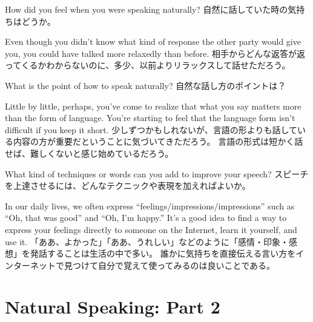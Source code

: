 \documentclass[uplatex,dvipdfmx,b5paper,english,10pt]{jsbook}
\newif\ifNATURALSPEAKINGPARTTWO
\begin{document}
\begin{toiquestion}
\ifEnglish
How did you feel when you were speaking naturally?
\else
自然に話していた時の気持ちはどうか。
\fi
\end{toiquestion}
\begin{toianswer}
\ifEnglish
Even though you didn't know what kind of response the other party would give you, you could have talked more relaxedly than before.
\else
相手からどんな返答が返ってくるかわからないのに、多少、以前よりリラックスして話せただろう。
\fi
\end{toianswer}

\begin{toiquestion}
\ifEnglish
What is the point of how to speak naturally?
\else
自然な話し方のポイントは？
\fi
\end{toiquestion}
\begin{toianswer}
\ifEnglish
Little by little, perhaps, you've come to realize that what you say matters more than the form of language.
You're starting to feel that the language form isn't difficult if you keep it short.
\else
少しずつかもしれないが、言語の形よりも話している内容の方が重要だということに気づいてきただろう。
言語の形式は短かく話せば、難しくないと感じ始めているだろう。
\fi
\end{toianswer}

\begin{toiquestion}
\ifEnglish
What kind of techniques or words can you add to improve your speech?
\else
スピーチを上達させるには、どんなテクニックや表現を加えればよいか。
\fi
\end{toiquestion}
\begin{toianswer}
\ifEnglish
In our daily lives, we often express ``feelings/impressions/impressions'' such as ``Oh, that was good'' and ``Oh, I'm happy.''
It's a good idea to find a way to express your feelings directly to someone on the Internet, learn it yourself, and use it.
\else
「ああ、よかった」「ああ、うれしい」などのように「感情・印象・感想」を発話することは生活の中で多い。
誰かに気持ちを直接伝える言い方をインターネットで見つけて自分で覚えて使ってみるのは良いことである。
\fi%
\end{toianswer}

%

\fi%

\ifNATURALSPEAKINGPARTTWO
\ifEnglish
\chapter{Natural Speaking: Part 2}
\else
\end{document}
